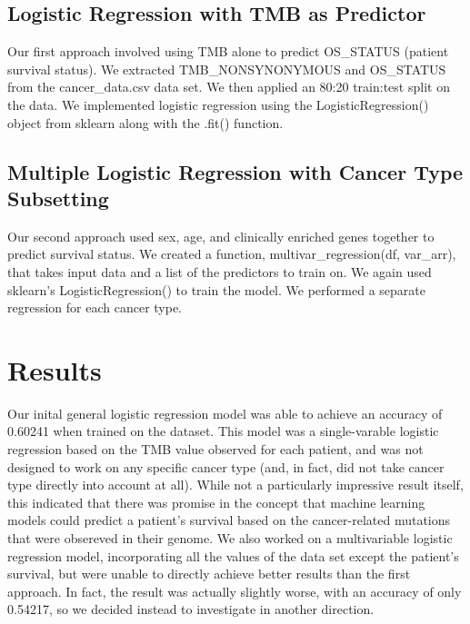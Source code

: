 \documentclass{article}
\begin{document}
\subsection{Logistic Regression with TMB as Predictor}
Our first approach involved using TMB alone to predict OS\_STATUS (patient survival status). We extracted TMB\_NONSYNONYMOUS and OS\_STATUS from the cancer\_data.csv data set. We then applied an 80:20 train:test split on the data. We implemented logistic regression using the LogisticRegression() object from sklearn along with the .fit() function.
\subsection{Multiple Logistic Regression with Cancer Type Subsetting}
Our second approach used sex, age, and clinically enriched genes together to predict survival status. We created a function, multivar\_regression(df, var\_arr), that takes input data and a list of the predictors to train on. We again used sklearn's LogisticRegression() to train the model. We performed a separate regression for each cancer type.
\section{Results}
Our inital general logistic regression model was able to achieve an accuracy of 0.60241 when trained on the dataset. This model was a single-varable logistic regression based on the TMB value observed for each patient, and was not designed to work on any specific cancer type (and, in fact, did not take cancer type directly into account at all). While not a particularly impressive result itself, this indicated that there was promise in the concept that machine learning models could predict a patient's survival based on the cancer-related mutations that were obsereved in their genome. We also worked on a multivariable logistic regression model, incorporating all the values of the data set except the patient's survival, but were unable to directly achieve better results than the first approach. In fact, the result was actually slightly worse, with an accuracy of only 0.54217, so we decided instead to investigate in another direction.
\end{document}
